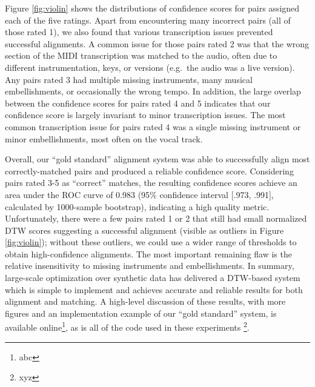 \documentclass{article}
\begin{document}
Figure \ref{fig:violin} shows the distributions of confidence scores for pairs assigned each of the five ratings.
Apart from encountering many incorrect pairs (all of those rated 1), we also found that various transcription issues prevented successful alignments.
A common issue for those pairs rated 2 was that the wrong section of the MIDI transcription was  matched to the audio, often due to different instrumentation, keys, or versions (e.g.\ the audio was a live version).
Any pairs rated 3 had multiple missing instruments, many musical embellishments, or occasionally the wrong tempo.
In addition, the large overlap between the confidence scores for pairs rated 4 and 5 indicates that our confidence score is largely invariant to minor transcription issues.
The most common transcription issue for pairs rated 4 was a single missing instrument or minor embellishments, most often on the vocal track.

Overall, our ``gold standard'' alignment system was able to successfully align most correctly-matched pairs and produced a reliable confidence score.
Considering pairs rated 3-5 as ``correct'' matches, the resulting confidence scores achieve an area under the ROC curve of 0.983 (95\% confidence interval [.973, .991], calculated by 1000-sample bootstrap), indicating a high quality metric.
Unfortunately, there were a few pairs rated 1 or 2 that still had small normalized DTW scores suggesting a successful alignment (visible as outliers in Figure \ref{fig:violin}); without these outliers, we could use a wider range of thresholds to obtain high-confidence alignments.
The most important remaining flaw is the relative insensitivity to missing instruments and embellishments.
In summary, large-scale optimization over synthetic data has delivered a DTW-based system which is simple to implement and achieves accurate and reliable results for both alignment and matching.
A high-level discussion of these results, with more figures and an implementation example of our ``gold standard'' system, is available online\footnote{abc}, as is all of the code used in these experiments \footnote{xyz}.



\end{document}
